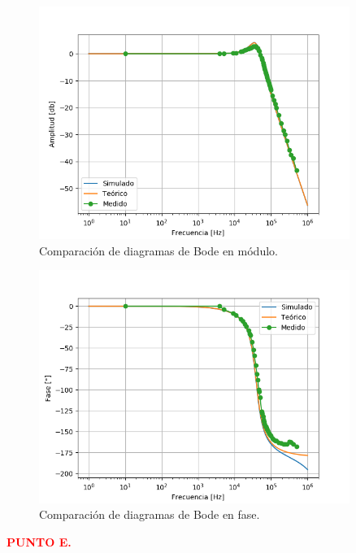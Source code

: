 \begin{figure}[H]
	\centering
	\includegraphics[width=0.9\textwidth]{Ejercicio2/Mediciones/Modulo.png}
\caption{Comparación de diagramas de Bode en módulo.}
	\label{fig:bodemod}
\end{figure}
\begin{figure}[H]
	\centering
	\includegraphics[width=0.9\textwidth]{Ejercicio2/Mediciones/Fase.png}
\caption{Comparación de diagramas de Bode en fase.}
	\label{fig:bodefase}
\end{figure}

\begin{center}
	\textcolor{red}{\textbf{PUNTO E.}}
\end{center}


